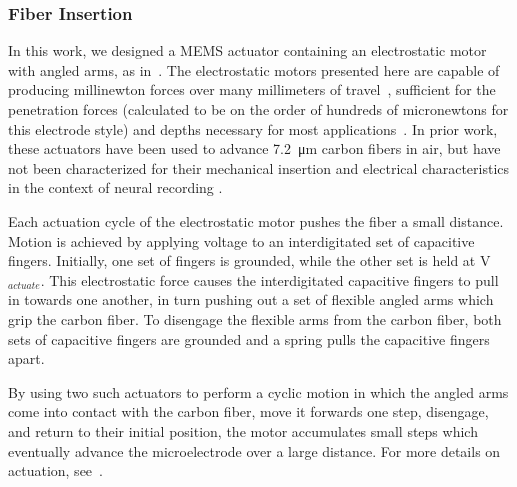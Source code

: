     \subsubsection{Fiber Insertion}

    In this work, we designed a MEMS actuator containing an electrostatic motor with angled arms, as in~\cite{Penskiy2013, Schindler2017}. The electrostatic motors presented here are capable of producing millinewton forces over many millimeters of travel~\cite{Yeh2002, Penskiy2013, Contreras2017, Schindler2017}, sufficient for the penetration forces (calculated to be on the order of hundreds of micronewtons for this electrode style) and depths necessary for most applications~\cite{Massey2018,Patel2016,Kozai2012}. In prior work, these actuators have been used to advance \SI{7.2}{\micro\meter} carbon fibers in air, but have not been characterized for their mechanical insertion and electrical characteristics in the context of neural recording \cite{Schindler2017}.
    
    Each actuation cycle of the electrostatic motor pushes the fiber a small distance. Motion is achieved by applying voltage to an interdigitated set of capacitive fingers. Initially, one set of fingers is grounded, while the other set is held at V$_{actuate}$. This electrostatic force causes the interdigitated capacitive fingers to pull in towards one another, in turn pushing out a set of flexible angled arms which grip the carbon fiber. To disengage the flexible arms from the carbon fiber, both sets of capacitive fingers are grounded and a spring pulls the capacitive fingers apart. 
    
    By using two such actuators to perform a cyclic motion in which the angled arms come into contact with the carbon fiber, move it forwards one step, disengage, and return to their initial position, the motor accumulates small steps which eventually advance the microelectrode over a large distance. For more details on actuation, see~\cite{Penskiy2013}.


